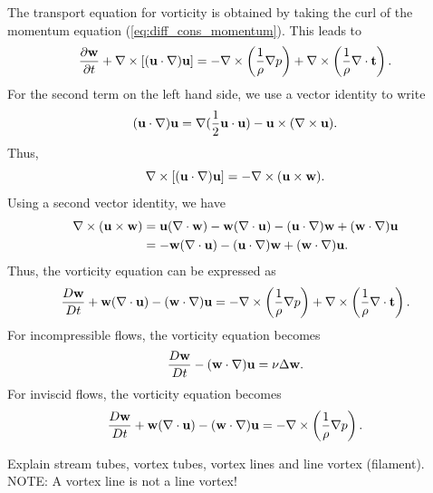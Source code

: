 \documentclass[oneside,a4paper,11pt]{report}
\begin{document}
The transport equation for vorticity is obtained by taking the curl of the momentum equation (\ref{eq:diff_cons_momentum}). This leads to
\begin{equation}
    \frac{\partial \mathbf{w}}{\partial t} + \nabla \times [ (\mathbf{u} \cdot \nabla ) \mathbf{u}] = -\nabla \times \left ( \frac{1}{\rho} \nabla p \right)+  \nabla \times \left ( \frac{1}{\rho} \nabla \cdot \mathbf{t} \right ).
\end{equation}
For the second term on the left hand side, we use a vector identity to write
\begin{equation}
(\mathbf{u} \cdot \nabla) \mathbf{u} = \nabla (\frac{1}{2} \mathbf{u} \cdot \mathbf{u}) - \mathbf{u} \times (\nabla \times \mathbf{u}).
\end{equation}
Thus, 
\begin{equation}
    \nabla \times [(\mathbf{u} \cdot \nabla) \mathbf{u}] = -\nabla \times (\mathbf{u} \times \mathbf{w}).
\end{equation}
Using a second vector identity, we have
\begin{align}
\nabla \times (\mathbf{u} \times \mathbf{w}) &= \mathbf{u} (\nabla \cdot \mathbf{w}) - \mathbf{w} (\nabla \cdot \mathbf{u}) - (\mathbf{u} \cdot \nabla) \mathbf{w} + (\mathbf{w} \cdot \nabla) \mathbf{u} \nonumber \\
& = - \mathbf{w} (\nabla \cdot \mathbf{u}) - (\mathbf{u} \cdot \nabla) \mathbf{w} + (\mathbf{w} \cdot \nabla) \mathbf{u}.
\end{align}
Thus, the vorticity equation can be expressed as
\begin{equation}
\label{eq:vort_eq}
\frac{D \mathbf{w}}{D t} +  \mathbf{w}(\nabla \cdot \mathbf{u}) - (\mathbf{w} \cdot \nabla) \mathbf{u} = -\nabla \times \left ( \frac{1}{\rho} \nabla p \right) + \nabla \times \left ( \frac{1}{\rho} \nabla \cdot \mathbf{t} \right ).
\end{equation}
For incompressible flows, the vorticity equation becomes
\begin{equation}
\label{eq:vort_eq_incomp}
\frac{D \mathbf{w}}{D t} - (\mathbf{w} \cdot \nabla) \mathbf{u} = \nu \Delta \mathbf{w}.
\end{equation}
For inviscid flows, the vorticity equation becomes
\begin{equation}
\label{eq:vort_eq_inviscid}
\frac{D \mathbf{w}}{D t} +  \mathbf{w}(\nabla \cdot \mathbf{u}) - (\mathbf{w} \cdot \nabla) \mathbf{u} = -\nabla \times \left ( \frac{1}{\rho} \nabla p \right).
\end{equation}

Explain stream tubes, vortex tubes, vortex lines and line vortex (filament). NOTE: A vortex line is not a line vortex!

\end{document}

